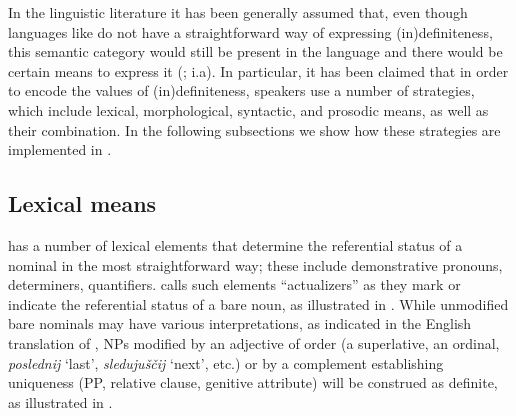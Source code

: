 \documentclass[output=paper]{langscibook}
\begin{document}
In the linguistic literature it has been generally assumed that, even though languages like  do not have a straightforward way of expressing (in)defi\-nite\-ness, this semantic category would still be present in the language and there would be certain means to express it (\citealt{GalkinaFedoruk1963,Pospelov1970}; i.a). %
In particular, it has been claimed
that in order to encode the values of (in)defi\-nite\-ness,  speakers use a number of strategies, which include lexical, %
morphological, syntactic, and prosodic means, as well as %
their combination. In the following subsections we show how these strategies are implemented in .

\subsection{Lexical means}
 has a number of lexical elements that determine the referential status of a nominal in the most straightforward way; these include demonstrative pronouns, determiners, quantifiers. \citet{Paduceva1985} calls such elements ``actualizers'' as they mark or indicate the referential status of a bare noun, as illustrated in . While unmodified bare nominals may have various interpretations, as indicated in the English translation of
, NPs modified by an adjective of order (a superlative, an ordinal, \textit{poslednij} `last', \textit{sledujuščij}  `next', etc.) %
or by a complement establishing uniqueness (PP, relative clause, genitive attribute) %
will be construed as definite, as illustrated in .

\end{document}
